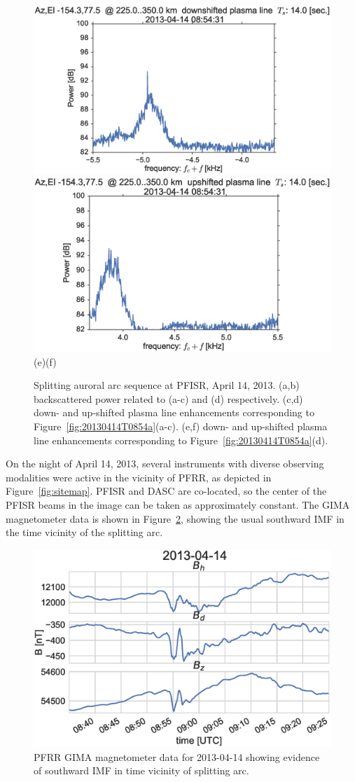 \begin{figure}
	\includegraphics[width=0.425\columnwidth,trim=0 50 0 0]{gfx/2013-04-14T0854/plasmaDOWNslice2013-04-1408-54-31}
	\includegraphics[width=0.425\columnwidth,trim=0 50 0 0]{gfx/2013-04-14T0854/plasmaUPslice2013-04-1408-54-31}\\
	
	\vspace{-1.2cm}
	\hspace{0.0cm}(e)\hspace{0.4\columnwidth}(f)
	\vspace{0.3cm}
	
	\caption{Splitting auroral arc sequence at PFISR, April 14, 2013.
		(a,b) backscattered power related to (a-c) and (d) respectively.
		(c,d) down- and up-shifted plasma line enhancements corresponding to Figure~\ref{fig:20130414T0854a}(a-c).
		(e,f) down- and up-shifted plasma line enhancements corresponding to Figure~\ref{fig:20130414T0854a}(d).}
	\label{fig:20130414T0854b}
\end{figure}
On the night of April 14, 2013, several instruments with diverse observing modalities were active in the vicinity of PFRR, as depicted in Figure~\ref{fig:sitemap}. 
PFISR and DASC are co-located, so the center of the PFISR beams in the image can be taken as approximately constant.
The GIMA magnetometer data is shown in Figure~\ref{fig:gima0854}, showing the usual southward IMF in the time vicinity of the splitting arc.
\begin{figure}
	\includegraphics[width=\columnwidth]{gfx/2013-04-14T0854/mag}
	\caption{PFRR GIMA magnetometer data for 2013-04-14 showing evidence of southward IMF in time vicinity of splitting arc.}
	\label{fig:gima0854}
\end{figure}


